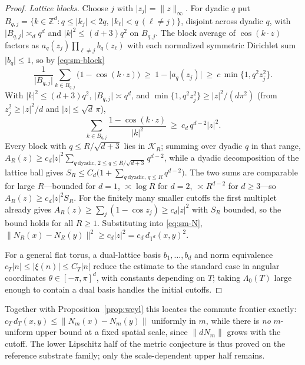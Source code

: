 \documentclass[review,supplement]{siamart220329}
\begin{document}
\begin{proof}
\smallskip\noindent\emph{Lattice blocks.} Choose $j$ with
$\lvert z_j\rvert=\lVert z\rVert_\infty$. For dyadic $q$ put
$B_{q,j}=\{k\in\mathbb Z^d:q\le\lvert k_j\rvert<2q,\ \lvert k_\ell\rvert<q\ (\ell\ne j)\}$,
disjoint across dyadic $q$, with $\lvert B_{q,j}\rvert\asymp_d q^d$ and
$\lvert k\rvert^2\le(d+3)q^2$ on $B_{q,j}$. The block average of $\cos(k\cdot z)$
factors as $a_q(z_j)\prod_{\ell\ne j}b_q(z_\ell)$ with each normalized symmetric
Dirichlet sum $\lvert b_q\rvert\le1$, so by \eqref{eq:sm-block}
\[
\frac1{\lvert B_{q,j}\rvert}\sum_{k\in B_{q,j}}\big(1-\cos(k\cdot z)\big)
\ \ge\ 1-\lvert a_q(z_j)\rvert\ \ge\ c\,\min\{1,q^2z_j^2\}.
\]
With $\lvert k\rvert^2\le(d+3)q^2$, $\lvert B_{q,j}\rvert\asymp q^d$, and
$\min\{1,q^2z_j^2\}\ge\lvert z\rvert^2/(d\pi^2)$ (from $z_j^2\ge\lvert z\rvert^2/d$
and $\lvert z\rvert\le\sqrt d\,\pi$),
\[
\sum_{k\in B_{q,j}}\frac{1-\cos(k\cdot z)}{\lvert k\rvert^2}
\ \ge\ c_d\,q^{d-2}\lvert z\rvert^2.
\]
Every block with $q\le R/\sqrt{d+3}$ lies in $\mathcal K_R$; summing over dyadic $q$
in that range,
$A_R(z)\ge c_d\lvert z\rvert^2\sum_{q\ \mathrm{dyadic},\,2\le q\le R/\sqrt{d+3}}q^{d-2}$,
while a dyadic decomposition of the lattice ball gives
$S_R\le C_d\big(1+\sum_{q\ \mathrm{dyadic},\,q\le R}q^{d-2}\big)$. The two sums are
comparable for large $R$---bounded for $d=1$, $\asymp\log R$ for $d=2$,
$\asymp R^{d-2}$ for $d\ge3$---so $A_R(z)\ge c_d\lvert z\rvert^2S_R$. For the finitely
many smaller cutoffs the first multiplet already gives
$A_R(z)\ge\sum_{j}(1-\cos z_j)\ge c_d\lvert z\rvert^2$ with $S_R$ bounded, so the
bound holds for all $R\ge1$. Substituting into \eqref{eq:sm-N},
$\lVert N_R(x)-N_R(y)\rVert^2\ge c_d\lvert z\rvert^2=c_d\,d_{\mathbb T^d}(x,y)^2$.

For a general flat torus, a dual-lattice basis $b_1,\dots,b_d$ and norm equivalence
$c_T\lvert n\rvert\le\lvert\xi(n)\rvert\le C_T\lvert n\rvert$ reduce the estimate to the
standard case in angular coordinates $\theta\in[-\pi,\pi]^d$, with constants
depending on $T$; taking $\Lambda_0(T)$ large enough to contain a dual basis handles
the initial cutoffs.
\end{proof}

\noindent Together with Proposition~\ref{prop:weyl} this locates the commute
frontier exactly: $c_T\,d_T(x,y)\le\lVert N_m(x)-N_m(y)\rVert$ uniformly in $m$, while
there is \emph{no} $m$-uniform upper bound at a fixed spatial scale, since
$\lVert dN_m\rVert$ grows with the cutoff. The lower Lipschitz half of the metric
conjecture is thus proved on the reference substrate family; only the scale-dependent
upper half remains.
\end{document}
